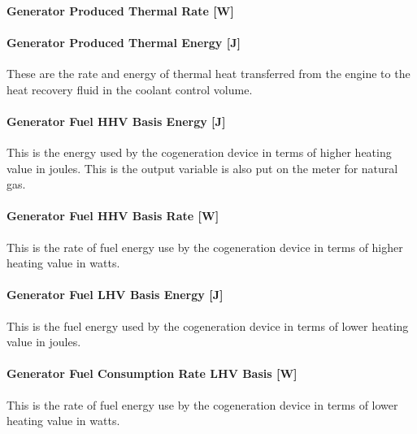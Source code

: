 \paragraph{Generator Produced Thermal Rate {[}W{]}}\label{generator-produced-thermal-rate-w-3}

\paragraph{Generator Produced Thermal Energy {[}J{]}}\label{generator-produced-thermal-energy-j-3}

These are the rate and energy of thermal heat transferred from the engine to the heat recovery fluid in the coolant control volume.

\paragraph{Generator Fuel HHV Basis Energy {[}J{]}}\label{generator-fuel-hhv-basis-energy-j-3}

This is the energy used by the cogeneration device in terms of higher heating value in joules. This is the output variable is also put on the meter for natural gas.

\paragraph{Generator Fuel HHV Basis Rate {[}W{]}}\label{generator-fuel-hhv-basis-rate-w-3}

This is the rate of fuel energy use by the cogeneration device in terms of higher heating value in watts.

\paragraph{Generator Fuel LHV Basis Energy {[}J{]}}\label{generator-fuel-lhv-basis-energy-j-1}

This is the fuel energy used by the cogeneration device in terms of lower heating value in joules.

\paragraph{Generator Fuel Consumption Rate LHV Basis {[}W{]}}\label{generator-fuel-consumption-rate-lhv-basis-w}

This is the rate of fuel energy use by the cogeneration device in terms of lower heating value in watts.

